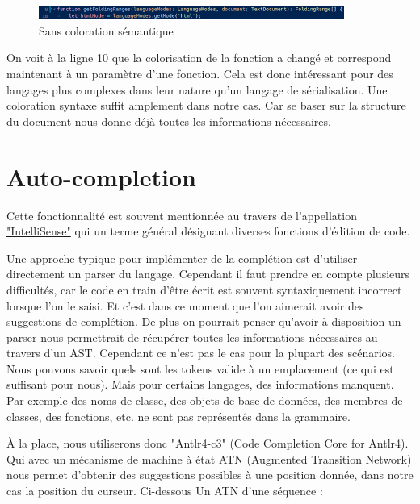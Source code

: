 \documentclass[
    iict, %
    il, %
]{heig-tb}
\begin{document}
\begin{figure}[!ht]
    \begin{center}
        \includegraphics[width=10cm]{assets/figures/semantic-coloration-without.png}
    \end{center}
    \caption[Sans coloration sémantique]{\label{semantic-coloration-without} Sans coloration sémantique}
\end{figure}

On voit à la ligne 10 que la colorisation de la fonction a changé et correspond maintenant à un paramètre d'une fonction.
Cela est donc intéressant pour des langages plus complexes dans leur nature qu'un langage de sérialisation. Une coloration syntaxe suffit amplement dans notre cas. Car se baser sur la structure du document nous donne déjà toutes les informations nécessaires.

\section{Auto-completion}
Cette fonctionnalité est souvent mentionnée au travers de l'appellation \href{https://code.visualstudio.com/docs/editor/intellisense}{"IntelliSense"} qui un terme général désignant diverses fonctions d'édition de code.

Une approche typique pour implémenter de la complétion est d'utiliser directement un parser du langage.
Cependant il faut prendre en compte plusieurs difficultés, car le code en train d'être écrit est souvent syntaxiquement incorrect lorsque l'on le saisi.  Et c'est dans ce moment que l'on aimerait avoir des suggestions de complétion. 
De plus on pourrait penser qu'avoir à disposition un parser nous permettrait de récupérer toutes les informations nécessaires au travers d'un AST. Cependant ce n'est pas le cas pour la plupart des scénarios. Nous pouvons savoir quels sont les tokens valide à un emplacement (ce qui est suffisant pour nous). Mais pour certains langages, des informations manquent. Par exemple des noms de classe, des objets de base de données, des membres de classes, des fonctions, etc. ne sont pas représentés dans la grammaire. 

À la place, nous utiliserons donc "Antlr4-c3" (Code Completion Core for Antlr4). Qui avec un mécanisme de machine à état ATN (Augmented Transition Network) nous permet d'obtenir des suggestions possibles à une position donnée, dans notre cas la position du curseur.
Ci-dessous Un ATN d'une séquence :
\end{document}
